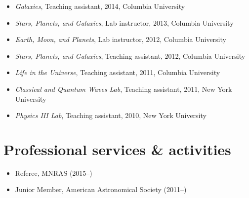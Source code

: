 \documentclass[12pt,letterpaper]{article}
\begin{document}
\begin{itemize}
	\item \emph{Galaxies}, Teaching assistant, 2014, Columbia University
	\item \emph{Stars, Planets, and Galaxies}, Lab instructor, 2013, Columbia University
	\item \emph{Earth, Moon, and Planets}, Lab instructor, 2012, Columbia University
	\item \emph{Stars, Planets, and Galaxies}, Teaching assistant, 2012, Columbia University
	\item \emph{Life in the Universe}, Teaching assistant, 2011, Columbia University
	\item \emph{Classical and Quantum Waves Lab}, Teaching assistant, 2011, New York University
	\item \emph{Physics III Lab}, Teaching assistant, 2010, New York University
\end{itemize}

\section*{Professional services \& activities}

\begin{itemize}
	\item Referee, MNRAS (2015--)
	\item Junior Member, American Astronomical Society (2011--)
\end{itemize}
\end{document}
